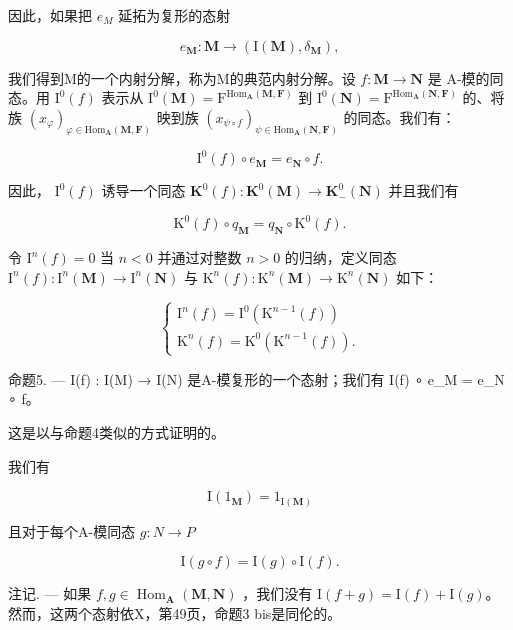 因此，如果把 \(e_{M}\) 延拓为复形的态射

\[
e _ {\mathbf {M}}: \mathbf {M} \rightarrow (\mathrm{I} (\mathbf {M}), \delta_ {\mathbf {M}}),
\]

我们得到M的一个内射分解，称为M的典范内射分解。设 \(f: \mathbf{M} \to \mathbf{N}\) 是 A-模的同态。用 \(\mathrm{I}^{0}(f)\) 表示从 \(\mathrm{I}^{0}(\mathbf{M}) = \mathrm{F}^{\mathrm{Hom}_{\mathbf{A}}(\mathbf{M},\mathbf{F})}\) 到 \(\mathrm{I}^{0}(\mathbf{N}) = \mathrm{F}^{\mathrm{Hom}_{\mathbf{A}}(\mathbf{N},\mathbf{F})}\) 的、将族 \((x_{\varphi})_{\varphi \in \mathrm{Hom}_{\mathbf{A}}(\mathbf{M},\mathbf{F})}\) 映到族 \((x_{\psi \circ f})_{\psi \in \mathrm{Hom}_{\mathbf{A}}(\mathbf{N},\mathbf{F})}\) 的同态。我们有：

\[
\mathrm{I} ^ {0} (f) \circ e _ {\mathbf {M}} = e _ {\mathbf {N}} \circ f.\tag{11}
\]

因此， \(\mathrm{I}^0 (f)\) 诱导一个同态 \(\mathbf{K}^0 (f):\mathbf{K}^0 (\mathbf{M})\to \mathbf{K}_-^0 (\mathbf{N})\) 并且我们有

\[
\mathrm{K} ^ {0} (f) \circ q _ {\mathbf {M}} = q _ {\mathbf {N}} \circ \mathrm{K} ^ {0} (f).\tag{12}
\]

令 \(\mathrm{I}^n(f) = 0\) 当 \(n < 0\) 并通过对整数 \(n > 0\) 的归纳，定义同态 \(\mathrm{I}^n(f): \mathrm{I}^n(\mathbf{M}) \to \mathrm{I}^n(\mathbf{N})\) 与 \(\mathrm{K}^n(f): \mathrm{K}^n(\mathbf{M}) \to \mathrm{K}^n(\mathbf{N})\) 如下：

\[
\left\{ \begin{array}{l} \mathrm{I} ^ {n} (f) = \mathrm{I} ^ {0} (\mathrm{K} ^ {n - 1} (f)) \\ \mathrm{K} ^ {n} (f) = \mathrm{K} ^ {0} (\mathrm{K} ^ {n - 1} (f)). \end{array} \right.\tag{13}
\]

命题5. --- I(f) : I(M) → I(N) 是A-模复形的一个态射；我们有 I(f) ∘ e\_M = e\_N ∘ f。

这是以与命题4类似的方式证明的。

我们有

\[
\mathrm{I} (1 _ {\mathbf {M}}) = 1 _ {\mathrm{I} (\mathbf {M})}\tag{14}
\]

且对于每个A-模同态 \(g: N \rightarrow P\)

\[
\mathrm{I} (g \circ f) = \mathrm{I} (g) \circ \mathrm{I} (f).\tag{15}
\]

注记. --- 如果 \(f, g \in \operatorname{Hom}_{\mathbf{A}}(\mathbf{M}, \mathbf{N})\) ，我们没有 \(\mathrm{I}(f + g) = \mathrm{I}(f) + \mathrm{I}(g)\)。然而，这两个态射依X，第49页，命题3 bis是同伦的。

